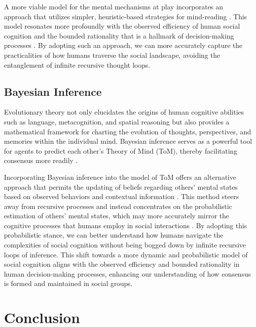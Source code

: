 \documentclass{article}
\begin{document}
A more viable model for the mental mechanisms at play incorporates an approach that utilizes simpler, heuristic-based strategies for mind-reading \citep{murphy2009beyond}. This model resonates more profoundly with the observed efficiency of human social cognition and the bounded rationality that is a hallmark of decision-making processes \citep{Simon1997}. By adopting such an approach, we can more accurately capture the practicalities of how humans traverse the social landscape, avoiding the entanglement of infinite recursive thought loops.

\subsection{Bayesian Inference}
Evolutionary theory not only elucidates the origins of human cognitive abilities such as language, metacognition, and spatial reasoning but also provides a mathematical framework for charting the evolution of thoughts, perspectives, and memories within the individual mind. Bayesian inference serves as a powerful tool for agents to predict each other's Theory of Mind (ToM), thereby facilitating consensus more readily \citep{suchow2017evolution}.

Incorporating Bayesian inference into the model of ToM offers an alternative approach that permits the updating of beliefs regarding others' mental states based on observed behaviors and contextual information \citep{Khalvati2019}. This method steers away from recursive processes and instead concentrates on the probabilistic estimation of others' mental states, which may more accurately mirror the cognitive processes that humans employ in social interactions \citep{rabinowitz2018machine}. By adopting this probabilistic stance, we can better understand how humans navigate the complexities of social cognition without being bogged down by infinite recursive loops of inference. This shift towards a more dynamic and probabilistic model of social cognition aligns with the observed efficiency and bounded rationality in human decision-making processes, enhancing our understanding of how consensus is formed and maintained in social groups.




\section{Conclusion}




\end{document}
